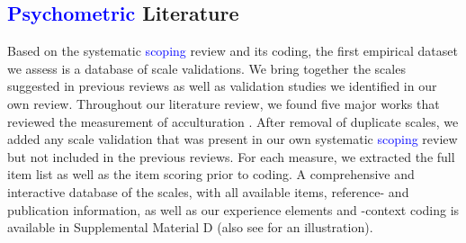 \subsection{\textcolor{blue}{Psychometric} Literature}

Based on the systematic \textcolor{blue}{scoping} review and its coding,
the first empirical dataset we assess is a database of scale
validations. We bring together the scales suggested in previous reviews
as well as validation studies we identified in our own review.
Throughout our literature review, we found five major works that
reviewed the measurement of acculturation
\citep{Celenk2011, Maestas2000, Matsudaira2006, Wallace2010, Zane2004}.
After removal of duplicate scales, we added any scale validation that
was present in our own systematic \textcolor{blue}{scoping} review but
not included in the previous reviews. For each measure, we extracted the
full item list as well as the item scoring prior to coding. A
comprehensive and interactive database of the scales, with all available
items, reference- and publication information, as well as our experience
elements and -context coding is available in Supplemental Material D
(also see  for an illustration).

